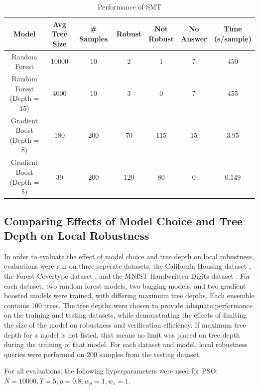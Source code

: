 \documentclass[pageno]{jpaper}
\begin{document}
\begin{doublespacing}
\begin{table}[h]
\centering
\begin{tabular}{| c | c c c c c c |} 
 \hline
 Model & \makecell{Avg Tree \\ Size} & \# Samples & Robust & \makecell{Not \\ Robust} & \makecell{No \\ Answer} & \makecell{Time  \\ (s/sample)} \\ [0.5ex] 
 \hline\hline
Random Forest 					& 10000 & 10 & 2 & 1 & 7 & 450 \\ \hline
\makecell{Random Forest \\ (Depth = 15)} & 4000 & 10 & 3 & 0 & 7 & 455 \\ \hline
\makecell{Gradient Boost \\ (Depth = 8)}	& 180  & 200 & 70 & 115 & 15 & 3.95 \\ \hline
\makecell{Gradient Boost \\ (Depth = 5)} 	& 30  & 200 & 120 & 80 & 0 & 0.149 \\ [1ex] 
 \hline
\end{tabular}
\caption{Performance of SMT}
\label{table:smt}
\end{table}

\subsection{Comparing Effects of Model Choice and Tree Depth on Local Robustness}
In order to evaluate the effect of model choice and tree depth on local robustness, evaluations were run on three seperate datasets: the California Housing dataset \cite{california}, the Forest Covertype dataset \cite{covtype}, and the MNIST Handwritten Digits dataset \cite{mnist}. For each dataset, two random forest models, two bagging models, and two gradient boosted models were trained, with differing maximum tree depths. Each ensemble contains 100 trees. The tree depths were chosen to provide adequate performance on the training and testing datasets, while demonstrating the effects of limiting the size of the model on robustness and verification efficiency. If maximum tree depth for a model is not listed, that means no limit was placed on tree depth during the training of that model. For each dataset and model, local robustness queries were performed on 200 samples from the testing dataset.

For all evaluations, the following hyperparameters were used for PSO: $N = 10000, T = 5, \rho = 0.8, w_p = 1, w_s = 1$.


\end{doublespacing}
\end{document}
